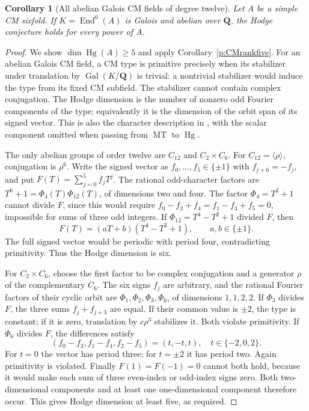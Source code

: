 \documentclass[10pt,reqno]{article}
\theoremstyle{emphasizedplain}
\newtheorem{corollary}[theorem]{Corollary}
\theoremstyle{emphasizeddefinition}
\theoremstyle{emphasizeddefinition}
\DeclareMathOperator{\End}{End}
\DeclareMathOperator{\Hg}{Hg}
\DeclareMathOperator{\MT}{MT}
\newcommand{\Q}{\mathbf Q}
\begin{document}
\begin{corollary}[All abelian Galois CM fields of degree twelve]
\label{p:CMabelian}
Let $A$ be a simple CM sixfold. If $K=\End^0(A)$ is Galois and
abelian over $\Q$, the Hodge conjecture holds for every power of $A$.
\end{corollary}
\begin{proof}
We show $\dim\Hg(A)\ge5$ and apply Corollary~\ref{p:CMrankfive}.
For an abelian Galois CM field, a CM type is primitive precisely when
its stabilizer under translation by $\operatorname{Gal}(K/\Q)$ is
trivial: a nontrivial stabilizer would induce the type from its fixed
CM subfield. The stabilizer cannot contain complex conjugation.
The Hodge dimension is the number of nonzero odd Fourier components
of the type; equivalently it is the dimension of the orbit span of
its signed vector. This is also the character description in
\cite[\S1]{Yanai}, with the scalar component omitted when passing
from $\MT$ to $\Hg$.

The only abelian groups of order twelve are $C_{12}$ and $C_2\times C_6$.
For $C_{12}=\langle\rho\rangle$, conjugation is $\rho^6$.
Write the signed vector as $f_0,\ldots,f_5\in\{\pm1\}$ with
$f_{j+6}=-f_j$, and put $F(T)=\sum_{j=0}^5 f_jT^j$.
The rational odd-character factors are
$T^6+1=\Phi_4(T)\Phi_{12}(T)$, of dimensions two and four.
The factor $\Phi_4=T^2+1$ cannot divide $F$, since this would require
$f_0-f_2+f_4=f_1-f_3+f_5=0$, impossible for sums of three odd integers.
If $\Phi_{12}=T^4-T^2+1$ divided $F$, then
\[
 F(T)=(aT+b)(T^4-T^2+1),\qquad a,b\in\{\pm1\}.
\]
The full signed vector would be periodic with period four, contradicting
primitivity. Thus the Hodge dimension is six.

For $C_2\times C_6$, choose the first factor to be complex conjugation
and a generator $\rho$ of the complementary $C_6$. The six signs
$f_j$ are arbitrary, and the rational Fourier factors of their cyclic
orbit are $\Phi_1,\Phi_2,\Phi_3,\Phi_6$, of dimensions $1,1,2,2$.
If $\Phi_3$ divides $F$, the three sums $f_j+f_{j+3}$ are equal.
If their common value is $\pm2$, the type is constant; if it is zero,
translation by $c\rho^3$ stabilizes it. Both violate primitivity.
If $\Phi_6$ divides $F$, the differences satisfy
\[
 (f_0-f_3,f_1-f_4,f_2-f_5)=(t,-t,t),\quad t\in\{-2,0,2\}.
\]
For $t=0$ the vector has period three; for $t=\pm2$ it has period two.
Again primitivity is violated. Finally $F(1)=F(-1)=0$ cannot both
hold, because it would make each sum of three even-index or odd-index
signs zero. Both two-dimensional components and at least one
one-dimensional component therefore occur. This gives Hodge dimension
at least five, as required.
\end{proof}
\end{document}
